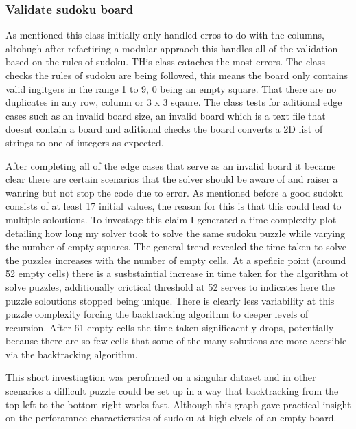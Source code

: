 \documentclass{report}
\begin{document}
\subsubsection*{Validate sudoku board}
As mentioned this class initially only handled erros to do with the columns, altohugh after refactiring a
modular appraoch this handles all of the validation based on the rules of sudoku. THis class cataches the most errors.
The class checks the rules of sudoku are being followed, this means the board only contains valid ingitgers in the range 1 to 9, 0 being an empty square.
That there are no duplicates in any row, column or 3 x 3 sqaure.
The class tests for aditional edge cases such as an invalid board size,
an invalid board which is a text file that doesnt contain a board and aditional checks the board converts a 2D list of strings to one of integers as expected.

After completing all of the edge cases that serve as an invalid board it became clear there are certain scenarios that the solver should be aware of and raiser a wanring but not stop the code due to error. As mentioned before a good sudoku consists of at least 17 initial values, the reason for this is that this could lead to multiple soloutions. To investage this claim I generated a time complexity plot detailing how long my solver took to solve the same sudoku puzzle while varying the number of empty squares. The general trend revealed the time taken to solve the puzzles increases with the number of empty cells. At a speficic point (around 52 empty cells) there is a susbstaintial increase in time taken for the algorithm ot solve puzzles, additionally crictical threshold at 52 serves to indicates here the puzzle soloutions stopped being unique. There is clearly less variability at this puzzle complexity forcing the backtracking algorithm to deeper levels of recursion. After 61 empty cells the time taken significacntly drops, potentially because there are so few cells that some of the many solutions are more accesible via the backtracking algorithm.

This short investiagtion was perofrmed on a singular dataset \cite{9} and in other scenarios a difficult puzzle could be set up in a way that backtracking from the top left to the bottom right works fast. Although this graph gave practical insight on the perforamnce charactierstics of sudoku at high elvels of an empty board.
\end{document}
